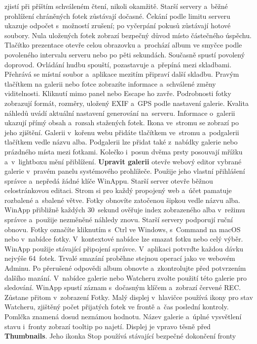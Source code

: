 \documentclass[11pt,a4paper]{article}
\newcommand{\ui}[1]{\textbf{#1}}
\begin{document}
zjistí při příštím schváleném čtení, nikoli okamžitě.
Starší servery a~běžné prohlížení
chráněných fotek zůstávají dočasné. Čekání podle limitu serveru ukazuje
odpočet s~možností zrušení; po vyčerpání pokusů zůstávají hotové soubory.
Nula uložených fotek zobrazí bezpečný důvod místo částečného úspěchu.
Tlačítko prezentace otevře celou obrazovku a~prochází album ve smyčce podle
povoleného intervalu serveru nebo po pěti sekundách. Současně spustí povolený
doprovod. Ovládání hudbu spouští, pozastavuje a~přepíná mezi skladbami.
Přehrává se místní soubor a~aplikace mezitím připraví další skladbu.
Pravým tlačítkem na galerii nebo fotce zobrazíte informace a~schválené změny
viditelnosti. Kliknutí mimo panel nebo Escape ho zavře. Podrobnosti fotky
zobrazují formát, rozměry, uložený EXIF a~GPS podle nastavení galerie. Kvalita
náhledů uvádí aktuální nastavení generování na~serveru. Informace o~galerii
ukazují přímý obsah a~rozsah stažených fotek. Ikona ve~stromu se
zobrazí po jeho zjištění. Galerii v~kořenu webu přidáte tlačítkem ve~stromu
a~podgalerii tlačítkem vedle názvu alba. Podgalerii lze přidat také z~nabídky
galerie nebo prázdného místa mezi fotkami. Kolečko i~posun dvěma prsty
posouvají mřížku a~v~lightboxu mění přiblížení.
\ui{Upravit galerii} otevře webový editor vybrané galerie v~pravém panelu
systémového prohlížeče. Použije jeho vlastní přihlášení správce a~nepředá
žádné klíče WinAppu. Starší server otevře běžnou celostránkovou editaci.
Strom si pro každý propojený web a~účet pamatuje rozbalené a~sbalené větve.
Fotky obnovíte zatočenou šipkou vedle názvu alba. WinApp přibližně každých
30~sekund ověřuje index zobrazeného alba v~režimu správce a~použije
nezměněné náhledy znovu. Starší servery podporují ruční obnovu.
Fotky označíte kliknutím s~Ctrl ve Windows, s~Command na macOS nebo
v~nabídce fotky. V~kontextové nabídce lze smazat fotku nebo celý výběr.
WinApp použije stávající připojení správce. V~aplikaci potvrďte každou dávku
nejvýše 64~fotek. Trvalé smazání proběhne stejnou operací jako ve webovém
Adminu. Po přerušené odpovědi album obnovte a~zkontrolujte před potvrzením
dalšího mazání.
V~nabídce galerie nebo Watcheru zvolte použití této galerie pro sledování.
WinApp spustí záznam s~dočasným klíčem a~zobrazí červené REC. Zůstane přitom
v~zobrazení Fotky. Malý displej v~hlavičce používá ikony pro stav Watcheru,
zjištěný počet přijatých fotek ve frontě a~čas poslední kontroly.
Pomlčka znamená dosud neznámou hodnotu. Název galerie a~úplné vysvětlení
stavu i~fronty zobrazí tooltip po najetí. Displej je vpravo těsně před
\ui{Thumbnails}. Jeho ikonka Stop používá stávající bezpečné dokončení fronty
\end{document}
